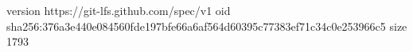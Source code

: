 version https://git-lfs.github.com/spec/v1
oid sha256:376a3e440e084560fde197bfe66a6af564d60395c77383ef71c34c0e253966c5
size 1793
